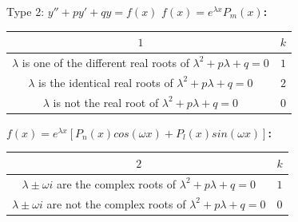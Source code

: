 \documentclass{beamer}
\begin{document}
\begin{frame}{Type 2: $y'' + py' + qy = f(x)$}
\textbf{$f(x) = e^{\lambda x}P_m(x)$:}
\begin{table}[!ht]
            \centering
            \begin{tabular}{c|c}
                 
                 $1$  & $k$ \\
                 
                 \hline
                 \makecell{$\lambda$ is one of the different real\\ roots of $\lambda^2 + p\lambda + q = 0$}
                 & $1$\\
                 
                 
                 
                 \hline
                \makecell{$\lambda$ is the identical real \\roots of $\lambda^2 + p\lambda + q = 0$}
                 & $2$\\
                 
                 \hline
                 \makecell{$\lambda$ is not the real\\ root of $\lambda^2 + p\lambda + q = 0$}
                 & $0$
                 
            \end{tabular}
    \end{table}
\textbf{$f(x) = e^{\lambda x}[P_n(x)cos(\omega x) + P_l(x) sin(\omega x)]$:}   
    \begin{table}[!ht]
            \centering
            \begin{tabular}{c|c}
                 
                 $2$  & $k$ \\
                 
                 \hline
                 \makecell{ $\lambda \pm \omega i$ are the complex\\ roots of $\lambda^2 + p\lambda + q = 0$ }
                 & $1$\\
                 
                 
                 
                 
                 
                 \hline
                 \makecell{$\lambda \pm \omega i$ are not the complex\\ roots of $\lambda^2 + p\lambda + q = 0$} 
                 & $0$
                 
            \end{tabular}
    \end{table}
\end{frame}
\end{document}
